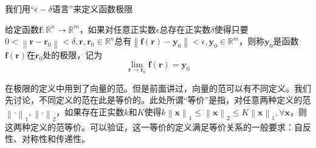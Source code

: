 \documentclass[main.tex]{subfiles}
\begin{document}
我们用“$\epsilon-\delta$语言”来定义函数极限

\begin{definition}[函数的极限]
给定函数$\mathbf{f}:\mathbb{R}^n\rightarrow\mathbb{R}^m$，如果对任意正实数$\epsilon$总存在正实数$\delta$使得只要$0<\left\|\mathbf{r}-\mathbf{r}_0\right\|<\delta,\mathbf{r},\mathbf{r}_0\in\mathbb{R}^n$总有$\left\|\mathbf{f}\left(\mathbf{r}\right)-\mathbf{y}_0\right\|<\epsilon,\mathbf{y}_0\in\mathbb{R}^m$，则称$\mathbf{y}_0$是函数$\mathbf{f}\left(\mathbf{r}\right)$在$\mathbf{r}_0$处的极限，记为
\[\lim_{\mathbf{r} \to\mathbf{r}_0} \mathbf{f}\left(\mathbf{r}\right)=\mathbf{y}_0\]
\end{definition}

在极限的定义中用到了向量的范。但是前面讲过，向量的范可以有不同定义。我们先讨论，不同定义的范在此是等价的。此处所谓“等价”是指，对任意两种定义的范$\left\|\cdot\right\|_1,\left\|\cdot\right\|_2$，如果存在正实数$k$和$K$使得$k\left\|\mathbf{x}\right\|_1\leq\left\|\mathbf{x}\right\|_2\leq K\left\|\mathbf{x}\right\|_1,\forall\mathbf{x}$，则这两种定义的范等价。可以验证，这一等价的定义满足等价关系的一般要求：自反性、对称性和传递性。
\end{document}
